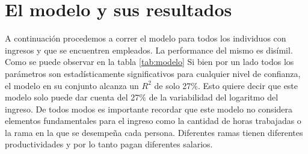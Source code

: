 \section{El modelo y sus resultados}
A continuación procedemos a correr el modelo para todos los individuos con ingresos y que se encuentren empleados. La performance del mismo es disímil. Como se puede observar en la tabla \ref{tab:modelo} Si bien por un lado todos los parámetros son estadísticamente significativos para cualquier nivel de confianza, el modelo en su conjunto alcanza un $R^2$ de solo 27\%. Esto quiere decir que este modelo solo puede dar cuenta del 27\% de la variabilidad del logaritmo del ingreso. De todos modos es importante recordar que este modelo no considera elementos fundamentales para el ingreso como la cantidad de horas trabajadas o la rama en la que se desempeña cada persona. Diferentes ramas tienen diferentes productividades y por lo tanto pagan diferentes salarios.
    
